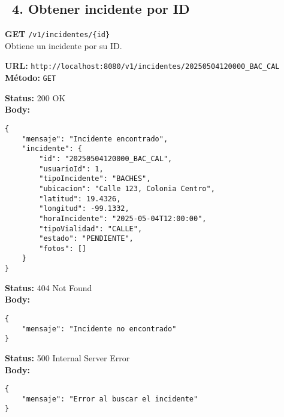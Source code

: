 \subsection*{\faServer\ 4. Obtener incidente por ID}
\begin{tcolorbox}[endpoint]
    \textbf{GET} \texttt{/v1/incidentes/\{id\}}\\
    Obtiene un incidente por su ID.
\end{tcolorbox}

\begin{tcolorbox}[request]
    \textbf{URL:} \textcolor{urlColor}{\texttt{http://localhost:8080/v1/incidentes/20250504120000\_BAC\_CAL}}\\
    \textbf{Método:} \textcolor{methodColor}{\texttt{GET}}
\end{tcolorbox}

\begin{tcolorbox}[response]
    \textbf{Status:} 200 OK\\
    \textbf{Body:}
    \begin{verbatim}
{
    "mensaje": "Incidente encontrado",
    "incidente": {
        "id": "20250504120000_BAC_CAL",
        "usuarioId": 1,
        "tipoIncidente": "BACHES",
        "ubicacion": "Calle 123, Colonia Centro",
        "latitud": 19.4326,
        "longitud": -99.1332,
        "horaIncidente": "2025-05-04T12:00:00",
        "tipoVialidad": "CALLE",
        "estado": "PENDIENTE",
        "fotos": []
    }
}
    \end{verbatim}
\end{tcolorbox}

\begin{tcolorbox}[response]
    \textbf{Status:} 404 Not Found\\
    \textbf{Body:}
    \begin{verbatim}
{
    "mensaje": "Incidente no encontrado"
}
    \end{verbatim}
\end{tcolorbox}

\begin{tcolorbox}[response]
    \textbf{Status:} 500 Internal Server Error\\
    \textbf{Body:}
    \begin{verbatim}
{
    "mensaje": "Error al buscar el incidente"
}
    \end{verbatim}
\end{tcolorbox}

